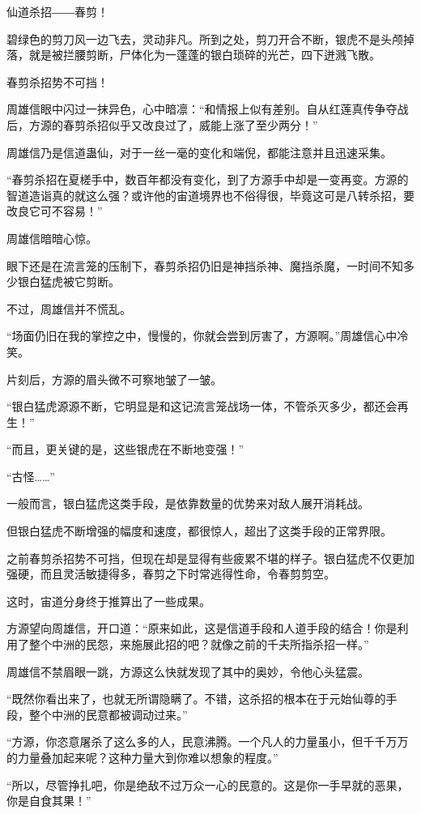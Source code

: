 \begin{this_body}
仙道杀招――春剪！

碧绿色的剪刀风一边飞去，灵动非凡。所到之处，剪刀开合不断，银虎不是头颅掉落，就是被拦腰剪断，尸体化为一蓬蓬的银白琐碎的光芒，四下迸溅飞散。

春剪杀招势不可挡！

周雄信眼中闪过一抹异色，心中暗凛：“和情报上似有差别。自从红莲真传争夺战后，方源的春剪杀招似乎又改良过了，威能上涨了至少两分！”

周雄信乃是信道蛊仙，对于一丝一毫的变化和端倪，都能注意并且迅速采集。

“春剪杀招在夏槎手中，数百年都没有变化，到了方源手中却是一变再变。方源的智道造诣真的就这么强？或许他的宙道境界也不俗得很，毕竟这可是八转杀招，要改良它可不容易！”

周雄信暗暗心惊。

眼下还是在流言笼的压制下，春剪杀招仍旧是神挡杀神、魔挡杀魔，一时间不知多少银白猛虎被它剪断。

不过，周雄信并不慌乱。

“场面仍旧在我的掌控之中，慢慢的，你就会尝到厉害了，方源啊。”周雄信心中冷笑。

片刻后，方源的眉头微不可察地皱了一皱。

“银白猛虎源源不断，它明显是和这记流言笼战场一体，不管杀灭多少，都还会再生！”

“而且，更关键的是，这些银虎在不断地变强！”

“古怪……”

一般而言，银白猛虎这类手段，是依靠数量的优势来对敌人展开消耗战。

但银白猛虎不断增强的幅度和速度，都很惊人，超出了这类手段的正常界限。

之前春剪杀招势不可挡，但现在却是显得有些疲累不堪的样子。银白猛虎不仅更加强硬，而且灵活敏捷得多，春剪之下时常逃得性命，令春剪剪空。

这时，宙道分身终于推算出了一些成果。

方源望向周雄信，开口道：“原来如此，这是信道手段和人道手段的结合！你是利用了整个中洲的民怨，来施展此招的吧？就像之前的千夫所指杀招一样。”

周雄信不禁眉眼一跳，方源这么快就发现了其中的奥妙，令他心头猛震。

“既然你看出来了，也就无所谓隐瞒了。不错，这杀招的根本在于元始仙尊的手段，整个中洲的民意都被调动过来。”

“方源，你恣意屠杀了这么多的人，民意沸腾。一个凡人的力量虽小，但千千万万的力量叠加起来呢？这种力量大到你难以想象的程度。”

“所以，尽管挣扎吧，你是绝敌不过万众一心的民意的。这是你一手早就的恶果，你是自食其果！”


\end{this_body}
